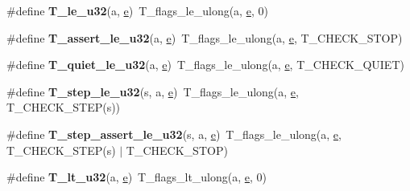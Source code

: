 \begin{DoxyCompactItemize}
\#define {\bfseries T\+\_\+le\+\_\+u32}(a,  \mbox{\hyperlink{sun4u_2tte_8h_a8b0b9ed08e0e18920ec2682f48228c27}{e}})~T\+\_\+flags\+\_\+le\+\_\+ulong(a, \mbox{\hyperlink{sun4u_2tte_8h_a8b0b9ed08e0e18920ec2682f48228c27}{e}}, 0)
\item 
\mbox{\label{group__RTEMSTestFrameworkChecksUInt32_gae800494d6e1f00ac1a6a35812e86847a}} 
\#define {\bfseries T\+\_\+assert\+\_\+le\+\_\+u32}(a,  \mbox{\hyperlink{sun4u_2tte_8h_a8b0b9ed08e0e18920ec2682f48228c27}{e}})~T\+\_\+flags\+\_\+le\+\_\+ulong(a, \mbox{\hyperlink{sun4u_2tte_8h_a8b0b9ed08e0e18920ec2682f48228c27}{e}}, T\+\_\+\+C\+H\+E\+C\+K\+\_\+\+S\+T\+OP)
\item 
\mbox{\label{group__RTEMSTestFrameworkChecksUInt32_ga7da0275f4d6c12b549b0e6381fd77ae3}} 
\#define {\bfseries T\+\_\+quiet\+\_\+le\+\_\+u32}(a,  \mbox{\hyperlink{sun4u_2tte_8h_a8b0b9ed08e0e18920ec2682f48228c27}{e}})~T\+\_\+flags\+\_\+le\+\_\+ulong(a, \mbox{\hyperlink{sun4u_2tte_8h_a8b0b9ed08e0e18920ec2682f48228c27}{e}}, T\+\_\+\+C\+H\+E\+C\+K\+\_\+\+Q\+U\+I\+ET)
\item 
\mbox{\label{group__RTEMSTestFrameworkChecksUInt32_ga1e6673c77ff635875de7de0646c81ba8}} 
\#define {\bfseries T\+\_\+step\+\_\+le\+\_\+u32}(s,  a,  \mbox{\hyperlink{sun4u_2tte_8h_a8b0b9ed08e0e18920ec2682f48228c27}{e}})~T\+\_\+flags\+\_\+le\+\_\+ulong(a, \mbox{\hyperlink{sun4u_2tte_8h_a8b0b9ed08e0e18920ec2682f48228c27}{e}}, T\+\_\+\+C\+H\+E\+C\+K\+\_\+\+S\+T\+EP(s))
\item 
\mbox{\label{group__RTEMSTestFrameworkChecksUInt32_gaf0120d038d8e78f92c1f2e5b089692ab}} 
\#define {\bfseries T\+\_\+step\+\_\+assert\+\_\+le\+\_\+u32}(s,  a,  \mbox{\hyperlink{sun4u_2tte_8h_a8b0b9ed08e0e18920ec2682f48228c27}{e}})~T\+\_\+flags\+\_\+le\+\_\+ulong(a, \mbox{\hyperlink{sun4u_2tte_8h_a8b0b9ed08e0e18920ec2682f48228c27}{e}}, T\+\_\+\+C\+H\+E\+C\+K\+\_\+\+S\+T\+EP(s) $\vert$ T\+\_\+\+C\+H\+E\+C\+K\+\_\+\+S\+T\+OP)
\item 
\mbox{\label{group__RTEMSTestFrameworkChecksUInt32_ga14fcec6ec7b66f6d96d45e818f861c22}} 
\#define {\bfseries T\+\_\+lt\+\_\+u32}(a,  \mbox{\hyperlink{sun4u_2tte_8h_a8b0b9ed08e0e18920ec2682f48228c27}{e}})~T\+\_\+flags\+\_\+lt\+\_\+ulong(a, \mbox{\hyperlink{sun4u_2tte_8h_a8b0b9ed08e0e18920ec2682f48228c27}{e}}, 0)

\end{DoxyCompactItemize}
